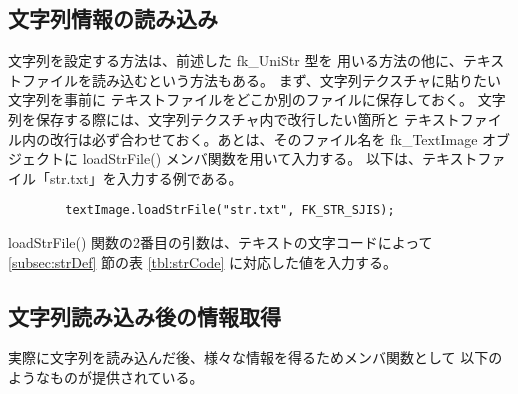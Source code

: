 \subsection{文字列情報の読み込み}
文字列を設定する方法は、前述した fk\_UniStr 型を
用いる方法の他に、テキストファイルを読み込むという方法もある。
まず、文字列テクスチャに貼りたい文字列を事前に
テキストファイルをどこか別のファイルに保存しておく。
文字列を保存する際には、文字列テクスチャ内で改行したい箇所と
テキストファイル内の改行は必ず合わせておく。あとは、そのファイル名を
fk\_TextImage オブジェクトに loadStrFile() メンバ関数を用いて入力する。
以下は、テキストファイル「str.txt」を入力する例である。
\\
\begin{screen}
\begin{verbatim}
        textImage.loadStrFile("str.txt", FK_STR_SJIS);
\end{verbatim}
\end{screen}
loadStrFile() 関数の2番目の引数は、テキストの文字コードによって
\ref{subsec:strDef} 節の表 \ref{tbl:strCode} に対応した値を入力する。

\subsection{文字列読み込み後の情報取得}
実際に文字列を読み込んだ後、様々な情報を得るためメンバ関数として
以下のようなものが提供されている。

